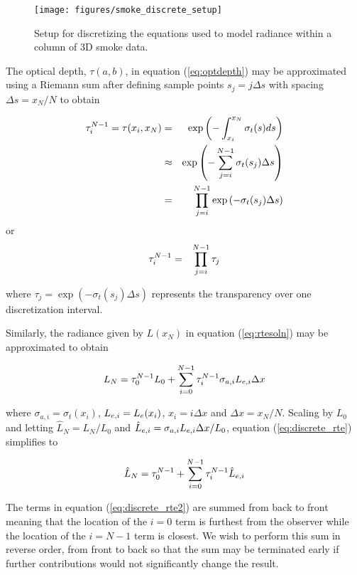 \begin{figure}[\figoptions]
\begin{center}
\texttt{[image: figures/smoke\_discrete\_setup]}
\end{center}
\caption {Setup for discretizing the equations used to model
radiance within a column of 3D smoke data.}
\label{fig:smokediscretesetup}
\end{figure}

The optical depth, $\tau(a,b)$, in equation (\ref{eq:optdepth}) may be approximated using a Riemann sum  after defining sample points $s_j=j\Delta s$ with spacing $\Delta s=x_N/N$ to obtain

\begin{eqnarray*}
\tau_{i}^{N-1}=\tau(x_i,x_N)&=&\exp\left(-\int_{x_i}^{x_N}\sigma_t(s)ds\right)\\
&\approx&\exp\left(-\sum_{j=i}^{N-1}\sigma_t(s_j)\Delta s\right)\\
&=&\prod_{j=i}^{N-1}\exp\left(-\sigma_t(s_j)\Delta s\right)
\end{eqnarray*}
or
\begin{eqnarray}
\label{eq:tauhat_discrete}
\tau_{i}^{N-1}&=&\prod_{j=i}^{N-1}\tau_j
\end{eqnarray}

where $\tau_j=\exp\left(-\sigma_t(s_j)\Delta s\right)$ represents the transparency over one discretization interval.

Similarly, the radiance given by $L(x_N)$ in equation (\ref{eq:rtesoln}) may be approximated to obtain

\begin{equation}
\label{eq:discrete_rte}
L_{N} = \tau_{0}^{N-1}L_0 +
\sum_{i=0}^{N-1}\tau_{i}^{N-1}\sigma_{a,i}L_{e,i}\Delta x
\end{equation}

where $\sigma_{a,i}=\sigma_t(x_i)$, $L_{e,i}=L_e(x_i)$, $x_i=i\Delta x$ and $\Delta x=x_N/N$. 
Scaling by $L_0$ and letting $\hat{L}_N=L_N/L_0$ and
$\hat{L}_{e,i}=\sigma_{a,i}L_{e,i}\Delta x/L_0$, equation (\ref{eq:discrete_rte}) simplifies to

\begin{equation}
\label{eq:discrete_rte2}
\hat{L}_N = \tau_{0}^{N-1} + \sum_{i=0}^{N-1}\tau_{i}^{N-1}\hat{L}_{e,i}
\end{equation}

The terms in equation (\ref{eq:discrete_rte2}) are summed from back to front meaning that the location of the $i=0$ term is furthest from the observer while the location of the $i=N-1$ term is closest.  We wish to perform this sum in reverse order, from front to back so that the sum may be terminated early if further contributions would not significantly change the result.

